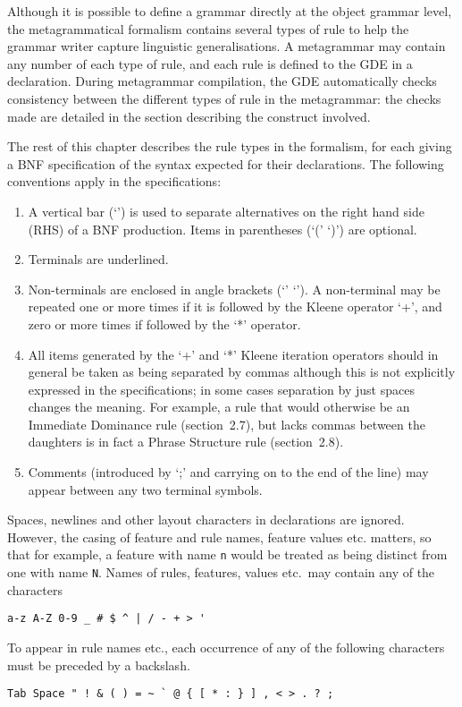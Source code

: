 Although it is possible to define a grammar directly at the object
grammar level, the metagrammatical formalism contains several types of
rule to help the grammar writer capture linguistic generalisations. A
metagrammar may contain any number of each type of rule, and each rule
is defined to the GDE in a declaration. During metagrammar compilation,
the GDE automatically checks consistency between the different
types of rule in the metagrammar: the checks made are detailed in
the section describing the construct involved.

The rest of this chapter describes the rule types in the formalism, for each
giving a BNF specification of the syntax expected for their declarations.
The following conventions apply in the specifications:

\begin{enumerate}
\item A vertical bar (`\altn') is used to separate alternatives on the right
hand side (RHS) of a BNF production.  Items in parentheses (`(' `)')
are optional.

\item Terminals are underlined.

\item Non-terminals are enclosed in angle brackets (`\la' `\ran'). A non-terminal
may be repeated one or more times if it is followed by the Kleene operator `+',
and zero or more times if followed by the `*' operator.

\item All items generated by the `+' and `*' Kleene iteration operators should
in general be taken as being separated by commas although this is not explicitly
expressed in the specifications; in some cases separation by just
spaces changes the meaning. For example, a rule that would otherwise be an
Immediate Dominance rule (section~2.7), but lacks commas between the daughters
is in fact a Phrase Structure rule (section~2.8).

\item Comments (introduced by `;' and carrying on to the end of the line) may
appear between any two terminal symbols.
\end{enumerate}

Spaces, newlines and other layout characters in declarations are
ignored. However, the casing of feature and rule names, feature values
etc. matters, so that for example, a feature with name {\tt n}
would be treated as being distinct from one with name {\tt N}. Names
of rules, features, values etc.\ may contain any of the characters
\begin{ex}
\begin{verbatim}
a-z A-Z 0-9 _ # $ ^ | / - + > '
\end{verbatim}
\end{ex}
To appear in rule names etc., each occurrence of any of the following characters
must be preceded by a backslash.
\begin{ex}
\begin{verbatim}
Tab Space " ! & ( ) = ~ ` @ { [ * : } ] , < > . ? ;
\end{verbatim}
\end{ex}

